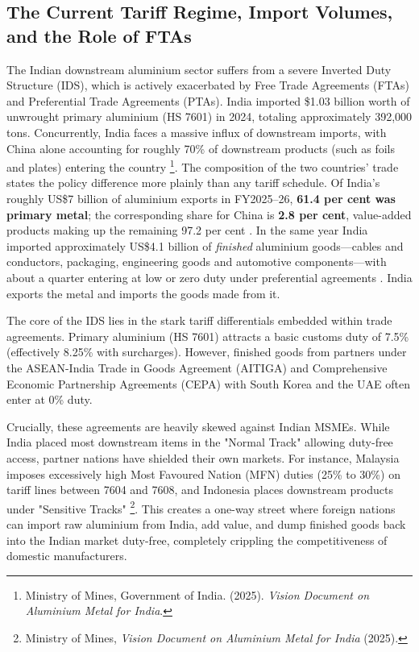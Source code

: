 \documentclass[11pt, a4paper]{article}
\numberwithin{figure}{section}
\numberwithin{table}{section}
\begin{document}
\subsection{The Current Tariff Regime, Import Volumes, and the Role of FTAs}
The Indian downstream aluminium sector suffers from a severe Inverted Duty Structure (IDS), which is actively exacerbated by Free Trade Agreements (FTAs) and Preferential Trade Agreements (PTAs). India imported \$1.03 billion worth of unwrought primary aluminium (HS 7601) in 2024, totaling approximately 392,000 tons. Concurrently, India faces a massive influx of downstream imports, with China alone accounting for roughly 70\% of downstream products (such as foils and plates) entering the country \cite{mom_vision2025}\footnote{Ministry of Mines, Government of India. (2025). \textit{Vision Document on Aluminium Metal for India}.}. The composition of the two countries' trade states the policy difference more plainly than any tariff schedule. Of India's roughly US\$7 billion of aluminium exports in FY2025--26, \textbf{61.4 per cent was primary metal}; the corresponding share for China is \textbf{2.8 per cent}, value-added products making up the remaining 97.2 per cent \cite{gtri2026}. In the same year India imported approximately US\$4.1 billion of \emph{finished} aluminium goods---cables and conductors, packaging, engineering goods and automotive components---with about a quarter entering at low or zero duty under preferential agreements \cite{gtri2026}. India exports the metal and imports the goods made from it.

The core of the IDS lies in the stark tariff differentials embedded within trade agreements. Primary aluminium (HS 7601) attracts a basic customs duty of 7.5\% (effectively 8.25\% with surcharges). However, finished goods from partners under the ASEAN-India Trade in Goods Agreement (AITIGA) and Comprehensive Economic Partnership Agreements (CEPA) with South Korea and the UAE often enter at 0\% duty.

Crucially, these agreements are heavily skewed against Indian MSMEs. While India placed most downstream items in the "Normal Track" allowing duty-free access, partner nations have shielded their own markets. For instance, Malaysia imposes excessively high Most Favoured Nation (MFN) duties (25\% to 30\%) on tariff lines between 7604 and 7608, and Indonesia places downstream products under "Sensitive Tracks" \cite{mom_vision2025}\footnote{Ministry of Mines, \textit{Vision Document on Aluminium Metal for India} (2025).}. This creates a one-way street where foreign nations can import raw aluminium from India, add value, and dump finished goods back into the Indian market duty-free, completely crippling the competitiveness of domestic manufacturers.
\end{document}
